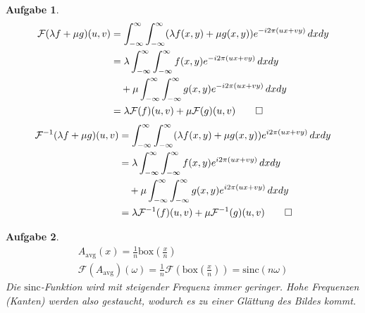 \documentclass[11pt]{article}
\theoremstyle{break}
\newtheorem{task}{Aufgabe}
\def\fourier{\mathcal{F}}
\def\INT{\int_{-\infty}^{\infty}}
\begin{document}
\begin{task}
    \begin{align*}
        \fourier(\lambda f + \mu g)(u,v) & = \INT\INT (\lambda f(x, y) + \mu g(x, y))e^{-i2\pi(ux + vy)}\, dxdy \\
                                         & = \lambda \INT\INT f(x,y)e^{-i2\pi(ux + vy)}\, dxdy                  \\
                                         & \quad + \mu \INT\INT g(x,y)e^{-i2\pi(ux + vy)}\, dxdy                \\
                                         & = \lambda \fourier(f)(u,v) + \mu \fourier(g)(u,v) \qed
    \end{align*}
    \begin{align*}
        \fourier^{-1}(\lambda f + \mu g)(u,v) & = \INT\INT (\lambda f(x, y) + \mu g(x, y))e^{i2\pi(ux + vy)}\, dxdy \\
                                         & = \lambda \INT\INT f(x,y)e^{i2\pi(ux + vy)}\, dxdy                  \\
                                         & \quad + \mu \INT\INT g(x,y)e^{i2\pi(ux + vy)}\, dxdy                \\
                                         & = \lambda \fourier^{-1}(f)(u,v) + \mu \fourier^{-1}(g)(u,v) \qed
    \end{align*}
\end{task}

\begin{task}
    \begin{gather*}
        A_{\text{avg}}(x) = \frac{1}{n} \text{box}(\frac{x}{n})\\
        \fourier(A_{\text{avg}})(\omega) = \frac{1}{n}\fourier(\text{box}(\frac{x}{n})) = \text{sinc}(n\omega)
    \end{gather*}
    Die $\text{sinc}$-Funktion wird mit steigender Frequenz immer geringer. Hohe Frequenzen (Kanten) werden also gestaucht, wodurch es zu einer Glättung des Bildes kommt.
\end{task}
\end{document}
